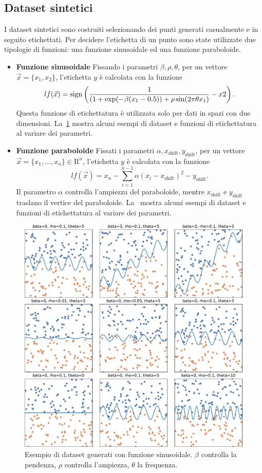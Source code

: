 \subsection{Dataset sintetici}
I dataset sintetici sono costruiti selezionando dei punti generati casualmente e in seguito etichettati.
Per decidere l'etichetta di un punto sono state utilizzate due tipologie di funzioni: una funzione sinusoidale ed una funzione paraboloide.
\begin{itemize}
    \item \textbf{Funzione sinusoidale} Fissando i parametri $\beta,\rho,\theta$, per un vettore $\Vec{x}=\{x_1,x_2\}$, l'etichetta $y$ è calcolata con la funzione
    \begin{equation}\label{eq:sinusoid_dataset_lf}
    lf(\Vec{x}) = \mathrm{sign}\left(\frac{1}{(1 + \exp(-\beta(x_1 - 0.5)) + \rho \sin(2\pi\theta x_1)} - x2\right).
    \end{equation}
    Questa funzione di etichettatura è utilizzata solo per dati in spazi con due dimensioni. La~\cref{fig:sinusoid_dataset} mostra alcuni esempi di dataset e funzioni di etichettatura al variare dei parametri.

    \item \textbf{Funzione paraboloide} Fissati i parametri $\alpha, x_\text{shift}, y_\text{shift}$, per un vettore $\Vec{x}=\{x_1, \dots, x_n\} \in \mathrm{R}^n$, l'etichetta $y$ è calcolata con la funzione
    \begin{equation}\label{eq:pacman_dataset_lf}
    lf(\Vec{x})= x_n - \sum_{i=1}^{n-1}\alpha(x_i - x_\text{shift})^2 - y_\text{shift}.
    \end{equation}
    Il parametro $\alpha$ controlla l'ampiezza del paraboloide, mentre $x_\text{shift}$ e $y_\text{shift}$ traslano il vertice del paraboloide.
    La~ mostra alcuni esempi di dataset e funzioni di etichettatura al variare dei parametri.
\end{itemize}
\begin{figure}
    \centering
    \includegraphics[width=.7\linewidth]{img/sinusoid_dataset_param_influence.pdf}
    \caption{Esempio di dataset generati con funzione sinusoidale. 
    $\beta$ controlla la pendenza, $\rho$ controlla l'ampiezza, $\theta$ la frequenza.}
    \label{fig:sinusoid_dataset}
\end{figure}
